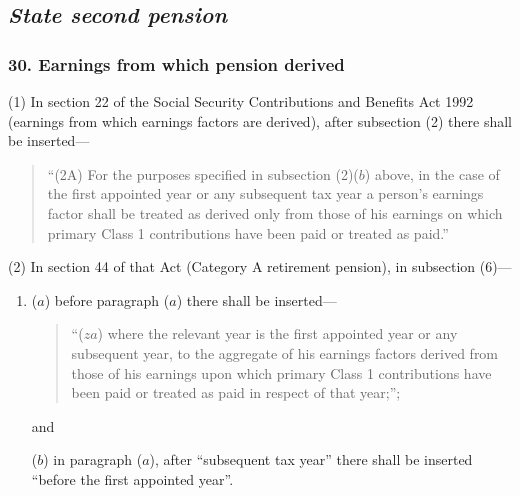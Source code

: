 \documentclass[12pt,a4paper]{article}
\begin{document}
\subsection{\itshape State second pension}

\subsubsection{30. Earnings from which pension derived}

(1) In section 22 of the Social Security Contributions and Benefits Act 1992 (earnings from which earnings factors are derived), after subsection (2)  there shall be inserted—
\begin{quotation}
“(2A) For the purposes specified in subsection (2)($b$)  above, in the case of the first appointed year or any subsequent tax year a person’s earnings factor shall be treated as derived only from those of his earnings on which primary Class 1 contributions have been paid or treated as paid.”
\end{quotation}

(2) In section 44 of that Act (Category A retirement pension), in subsection (6)—
\begin{enumerate}\item[]
($a$) before paragraph ($a$)  there shall be inserted—
\begin{quotation}
“($za$) where the relevant year is the first appointed year or any subsequent year, to the aggregate of his earnings factors derived from those of his earnings upon which primary Class 1 contributions have been paid or treated as paid in respect of that year;”;
\end{quotation}
and

($b$) in paragraph ($a$), after “subsequent tax year” there shall be inserted “before the first appointed year”.
\end{enumerate}
\end{document}
